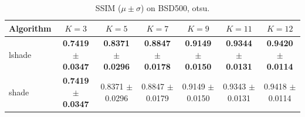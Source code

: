 \begin{table}[htbp]
\centering
\caption{SSIM ($\mu \pm \sigma$) on BSD500, otsu.}
\label{tab:exp1-otsu-ssim}
\begin{tabular}{lcccccc}
\toprule
Algorithm & $K=3$ & $K=5$ & $K=7$ & $K=9$ & $K=11$ & $K=12$ \\
\midrule
lshade & \textbf{0.7419 $\pm$ 0.0347} & \textbf{0.8371 $\pm$ 0.0296} & \textbf{0.8847 $\pm$ 0.0178} & \textbf{0.9149 $\pm$ 0.0150} & \textbf{0.9344 $\pm$ 0.0131} & \textbf{0.9420 $\pm$ 0.0114} \\
shade & \textbf{0.7419 $\pm$ 0.0347} & 0.8371 $\pm$ 0.0296 & 0.8847 $\pm$ 0.0179 & 0.9149 $\pm$ 0.0150 & 0.9343 $\pm$ 0.0131 & 0.9418 $\pm$ 0.0114 \\
\bottomrule
\end{tabular}
\end{table}